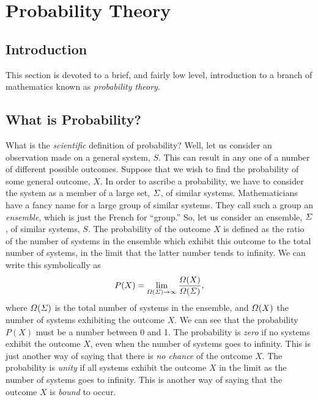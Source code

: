 \chapter{Probability Theory}\label{s2}

\section{Introduction}
This  section is devoted to a brief, and
fairly low level, introduction to a branch of mathematics known as
{\em probability theory}.

\section{What is Probability?}
What is the {\em scientific}
 definition of probability? Well, let us consider
an observation made on a general system, $S$. This can result in 
 any one of a number
of different possible outcomes. Suppose that we wish to find the probability of
some general outcome, $X$. In order to ascribe a probability, we have to
consider the system as a member of a large set, ${\mit\Sigma}$,
of similar systems.
Mathematicians have a fancy name for a large 
group of similar systems. They call such a group an {\em ensemble}, which is
just the French for ``group.'' So, let us consider an ensemble, ${\mit\Sigma}$, of 
similar systems, $S$. The probability of the outcome $X$ is defined as the
ratio of the number of systems in the ensemble which exhibit this outcome
to the total number of systems, in the limit that the latter
number tends to
infinity. We can write this symbolically as
\begin{equation}
P(X) = \lim_{{\mit\Omega}({\mit\Sigma})\rightarrow\infty}\frac{{\mit\Omega}(X)}{{\mit\Omega}({\mit\Sigma})},
\end{equation}
where ${\mit\Omega}({\mit\Sigma})$ is the total number of systems in the ensemble, 
and ${\mit\Omega}(X)$  the
number of systems exhibiting the outcome $X$. We can see that the probability
$P(X)$ must be a number between 0 and 1. The probability is {\em zero} if no
systems exhibit the outcome $X$, even when the number of systems goes to 
infinity. This is just another way of saying that there is {\em no chance}
 of the
outcome $X$. The probability is {\em unity} if all systems exhibit the outcome
$X$ in the limit as the number of systems goes to infinity. This is another
way of saying that the outcome $X$ is {\em bound} to occur.

